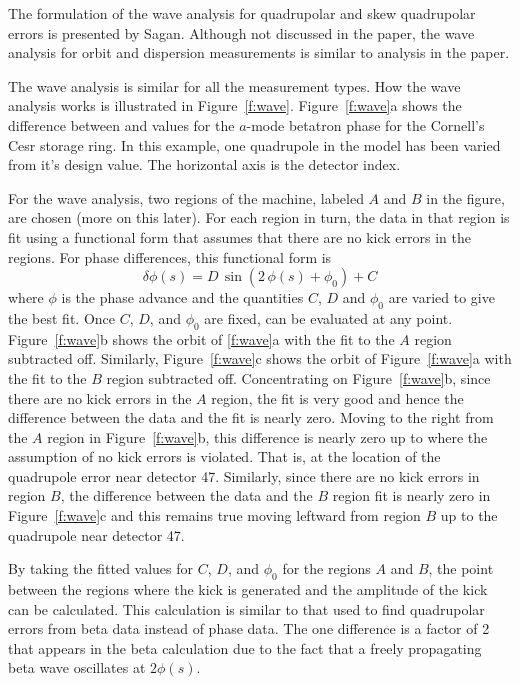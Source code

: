 The formulation of the wave analysis for quadrupolar and skew quadrupolar errors is presented by
Sagan\cite{b:wave}. Although not discussed in the paper, the wave analysis for orbit and dispersion
measurements is similar to analysis in the paper.

The wave analysis is similar for all the measurement types. How the wave analysis works is
illustrated in Figure~\ref{f:wave}.  Figure~\ref{f:wave}a shows the difference between 
and  values for the $a$-mode betatron phase for the Cornell's Cesr storage ring. In this
example, one quadrupole in the model has been varied from it's design value. The horizontal axis is
the detector index.

For the wave analysis, two regions of the machine, labeled $A$ and $B$ in the figure, are chosen
(more on this later). For each region in turn, the data in that region is fit using a functional
form that assumes that there are no kick errors in the regions.  For phase differences, this
functional form is
\begin{equation}
  \delta \phi(s) = D \, \sin(2 \, \phi(s) + \phi_0) + C
  \label{xabps}
\end{equation}
where $\phi$ is the phase advance and the quantities $C$, $D$ and $\phi_0$ are varied to give the
best fit.  Once $C$, $D$, and $\phi_0$ are fixed,  can be evaluated at any
point. Figure~\ref{f:wave}b shows the orbit of \ref{f:wave}a with the fit to the $A$ region
subtracted off. Similarly, Figure~\ref{f:wave}c shows the orbit of Figure~\ref{f:wave}a with the fit
to the $B$ region subtracted off. Concentrating on Figure~\ref{f:wave}b, since there are no kick
errors in the $A$ region, the fit is very good and hence the difference between the data and the fit
is nearly zero. Moving to the right from the $A$ region in Figure~\ref{f:wave}b, this difference is
nearly zero up to where the assumption of no kick errors is violated. That is, at the location of
the quadrupole error near detector 47. Similarly, since there are no kick errors in region $B$, the
difference between the data and the $B$ region fit is nearly zero in Figure~\ref{f:wave}c and this
remains true moving leftward from region $B$ up to the quadrupole near detector 47.

By taking the fitted values for $C$, $D$, and $\phi_0$ for the regions $A$ and $B$, the point
between the regions where the kick is generated and the amplitude of the kick can be
calculated. This calculation is similar to that used to find quadrupolar errors from beta data
instead of phase data. The one difference is a factor of 2 that appears in the beta calculation due
to the fact that a freely propagating beta wave oscillates at $2\phi(s)$.

